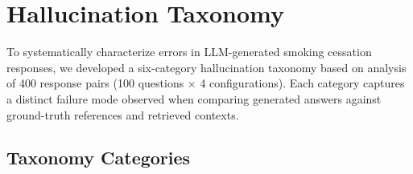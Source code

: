 
\section{Hallucination Taxonomy}
\label{sec:hallucination_taxonomy}

To systematically characterize errors in LLM-generated smoking cessation responses, we developed a six-category hallucination taxonomy based on analysis of 400 response pairs (100 questions $\times$ 4 configurations). Each category captures a distinct failure mode observed when comparing generated answers against ground-truth references and retrieved contexts.

\subsection{Taxonomy Categories}

